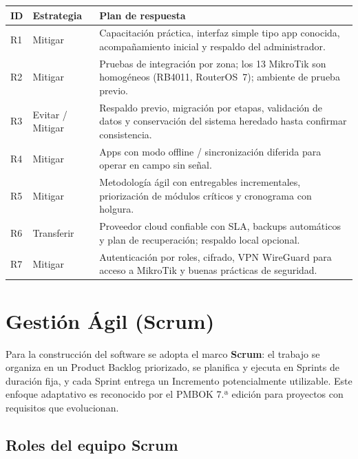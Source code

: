 \begin{center}
\label{tab:riesgos-respuesta}
\begin{tabularx}{\textwidth}{C{1cm} L{2.4cm} X}
\toprule
\textbf{ID} & \textbf{Estrategia} & \textbf{Plan de respuesta} \\
\midrule
R1 & Mitigar & Capacitación práctica, interfaz simple tipo app conocida,
acompañamiento inicial y respaldo del administrador. \\
R2 & Mitigar & Pruebas de integración por zona; los 13 MikroTik son homogéneos
(RB4011, RouterOS~7); ambiente de prueba previo. \\
R3 & Evitar / Mitigar & Respaldo previo, migración por etapas, validación de datos y
conservación del sistema heredado hasta confirmar consistencia. \\
R4 & Mitigar & Apps con modo offline / sincronización diferida para operar en campo
sin señal. \\
R5 & Mitigar & Metodología ágil con entregables incrementales, priorización de módulos
críticos y cronograma con holgura. \\
R6 & Transferir & Proveedor cloud confiable con SLA, backups automáticos y plan de
recuperación; respaldo local opcional. \\
R7 & Mitigar & Autenticación por roles, cifrado, VPN WireGuard para acceso a MikroTik
y buenas prácticas de seguridad. \\
\bottomrule
\end{tabularx}
\end{center}

\section{Gestión Ágil (Scrum)}
\label{sec:scrum}

Para la construcción del software se adopta el marco \textbf{Scrum}: el trabajo se
organiza en un Product Backlog priorizado, se planifica y ejecuta en Sprints de
duración fija, y cada Sprint entrega un Incremento potencialmente utilizable. Este
enfoque adaptativo es reconocido por el PMBOK 7.ª edición para proyectos con requisitos
que evolucionan.

\subsection{Roles del equipo Scrum}


